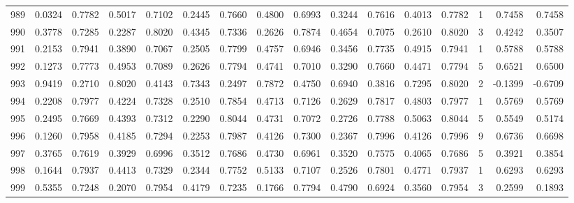\begin{tabular}{lrrrrrrrrrrrrrrr}
989 &      0.0324 &  0.7782 &  0.5017 &  0.7102 &  0.2445 &  0.7660 &  0.4800 &  0.6993 &  0.3244 &  0.7616 &   0.4013 &     0.7782 &      1 &                    0.7458 &                     0.7458 \\
990 &      0.3778 &  0.7285 &  0.2287 &  0.8020 &  0.4345 &  0.7336 &  0.2626 &  0.7874 &  0.4654 &  0.7075 &   0.2610 &     0.8020 &      3 &                    0.4242 &                     0.3507 \\
991 &      0.2153 &  0.7941 &  0.3890 &  0.7067 &  0.2505 &  0.7799 &  0.4757 &  0.6946 &  0.3456 &  0.7735 &   0.4915 &     0.7941 &      1 &                    0.5788 &                     0.5788 \\
992 &      0.1273 &  0.7773 &  0.4953 &  0.7089 &  0.2626 &  0.7794 &  0.4741 &  0.7010 &  0.3290 &  0.7660 &   0.4471 &     0.7794 &      5 &                    0.6521 &                     0.6500 \\
993 &      0.9419 &  0.2710 &  0.8020 &  0.4143 &  0.7343 &  0.2497 &  0.7872 &  0.4750 &  0.6940 &  0.3816 &   0.7295 &     0.8020 &      2 &                   -0.1399 &                    -0.6709 \\
994 &      0.2208 &  0.7977 &  0.4224 &  0.7328 &  0.2510 &  0.7854 &  0.4713 &  0.7126 &  0.2629 &  0.7817 &   0.4803 &     0.7977 &      1 &                    0.5769 &                     0.5769 \\
995 &      0.2495 &  0.7669 &  0.4393 &  0.7312 &  0.2290 &  0.8044 &  0.4731 &  0.7072 &  0.2726 &  0.7788 &   0.5063 &     0.8044 &      5 &                    0.5549 &                     0.5174 \\
996 &      0.1260 &  0.7958 &  0.4185 &  0.7294 &  0.2253 &  0.7987 &  0.4126 &  0.7300 &  0.2367 &  0.7996 &   0.4126 &     0.7996 &      9 &                    0.6736 &                     0.6698 \\
997 &      0.3765 &  0.7619 &  0.3929 &  0.6996 &  0.3512 &  0.7686 &  0.4730 &  0.6961 &  0.3520 &  0.7575 &   0.4065 &     0.7686 &      5 &                    0.3921 &                     0.3854 \\
998 &      0.1644 &  0.7937 &  0.4413 &  0.7329 &  0.2344 &  0.7752 &  0.5133 &  0.7107 &  0.2526 &  0.7801 &   0.4771 &     0.7937 &      1 &                    0.6293 &                     0.6293 \\
999 &      0.5355 &  0.7248 &  0.2070 &  0.7954 &  0.4179 &  0.7235 &  0.1766 &  0.7794 &  0.4790 &  0.6924 &   0.3560 &     0.7954 &      3 &                    0.2599 &                     0.1893 \\
\bottomrule
\end{tabular}
